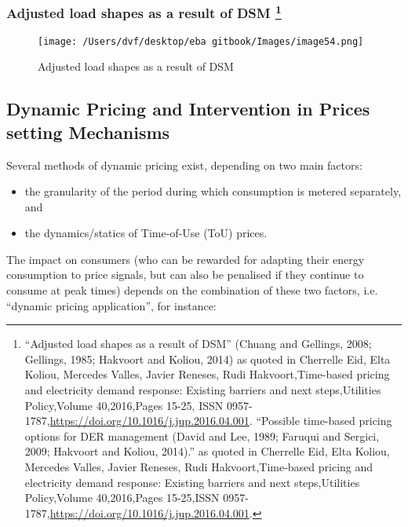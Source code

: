 \documentclass[]{book}
\let\rmarkdownfootnote\footnote%
\def\footnote{\protect\rmarkdownfootnote}
\theoremstyle{definition}
\theoremstyle{definition}
\theoremstyle{definition}
\theoremstyle{remark}
\begin{document}
\subsubsection[Adjusted load shapes as a result of DSM
]{\texorpdfstring{Adjusted load shapes as a result of DSM \footnote{``Adjusted
  load shapes as a result of DSM'' (Chuang and Gellings, 2008; Gellings,
  1985; Hakvoort and Koliou, 2014) as quoted in Cherrelle Eid, Elta
  Koliou, Mercedes Valles, Javier Reneses, Rudi Hakvoort,Time-based
  pricing and electricity demand response: Existing barriers and next
  steps,Utilities Policy,Volume 40,2016,Pages 15-25, ISSN
  0957-1787,\url{https://doi.org/10.1016/j.jup.2016.04.001}. ``Possible
  time-based pricing options for DER management (David and Lee, 1989;
  Faruqui and Sergici, 2009; Hakvoort and Koliou, 2014).'' as quoted in
  Cherrelle Eid, Elta Koliou, Mercedes Valles, Javier Reneses, Rudi
  Hakvoort,Time-based pricing and electricity demand response: Existing
  barriers and next steps,Utilities Policy,Volume 40,2016,Pages
  15-25,ISSN 0957-1787,\url{https://doi.org/10.1016/j.jup.2016.04.001}.}}{Adjusted load shapes as a result of DSM }}\label{adjusted-load-shapes-as-a-result-of-dsm-12}

\begin{figure}[htbp]
\centering
\texttt{[image: /Users/dvf/desktop/eba gitbook/Images/image54.png]}
\caption{Adjusted load shapes as a result of DSM}
\end{figure}

\subsection{Dynamic Pricing and Intervention in Prices setting
Mechanisms}\label{dynamic-pricing-and-intervention-in-prices-setting-mechanisms}

Several methods of dynamic pricing exist, depending on two main factors:

\begin{itemize}
\item
  the granularity of the period during which consumption is metered
  separately, and
\item
  the dynamics/statics of Time-of-Use (ToU) prices.
\end{itemize}

The impact on consumers (who can be rewarded for adapting their energy
consumption to price signals, but can also be penalised if they continue
to consume at peak times) depends on the combination of these two
factors, i.e. ``dynamic pricing application'', for instance:
\end{document}
